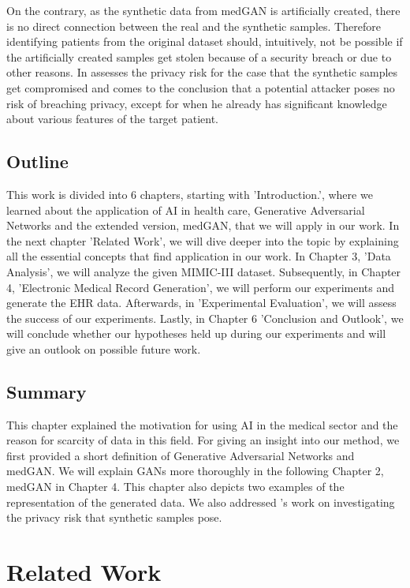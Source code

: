 \documentclass[11pt, a4paper, oneside]{book}
\begin{document}
On the contrary, as the synthetic data from medGAN is artificially created, there is no direct connection between the real and the synthetic samples. Therefore identifying patients from the original dataset should, intuitively, not be possible if the artificially created samples get stolen because of a security breach or due to other reasons. In \citep{Choi2017} assesses the privacy risk for the case that the synthetic samples get compromised and comes to the conclusion that a potential attacker poses no risk of breaching privacy, except for when he already has significant knowledge about various features of the target patient.

\section{Outline}
This work is divided into 6 chapters, starting with 'Introduction.', where we learned about the application of AI in health care, Generative Adversarial Networks and the extended version, medGAN, that we will apply in our work. In the next chapter 'Related Work', we will dive deeper into the topic by explaining all the essential concepts that find application in our work. In Chapter 3,  'Data Analysis', we will analyze the given MIMIC-III dataset. Subsequently, in Chapter 4, 'Electronic Medical Record Generation', we will perform our experiments and generate the EHR data. Afterwards, in 'Experimental Evaluation', we will assess the success of our experiments. Lastly, in Chapter 6 'Conclusion and Outlook', we will conclude whether our hypotheses held up during our experiments and will give an outlook on possible future work.

\section{Summary}
This chapter explained the motivation for using AI in the medical sector and the reason for scarcity of data in this field. For giving an insight into our method, we first provided a short definition of Generative Adversarial Networks and medGAN. We will explain GANs more thoroughly in the following Chapter 2, medGAN in Chapter 4. This chapter also depicts two examples of the representation of the generated data. We also addressed \citep{Choi2017}'s work on investigating the privacy risk that synthetic samples pose.

\chapter{Related Work}
\end{document}
